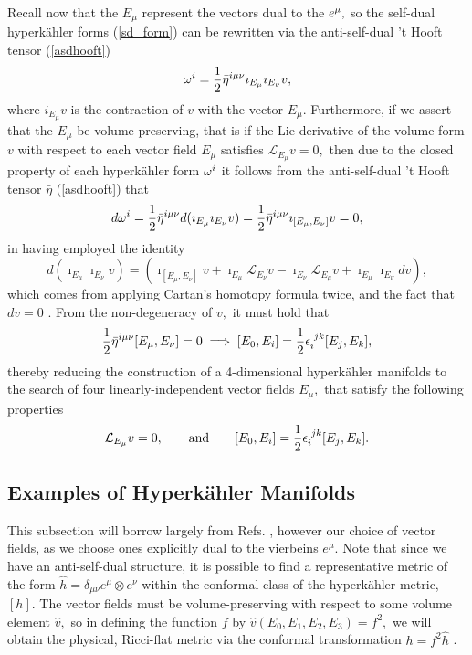 \documentclass[a4paper,12pt, onecolumn, notitlepage]{article}
\theoremstyle{definition}
\theoremstyle{remark}
\newcommand{\w}{\omega}
\newcommand{\m}{\mu}
\newcommand{\n}{\nu}
\newcommand{\e}{\epsilon}
\newcommand{\HK}{hyperk\"ahler }
\begin{document}
Recall now that the $E_{\m}$ represent the vectors dual to the $e\indices{^\m},$ so the self-dual \HK forms (\ref{sd_form}) can be rewritten via the anti-self-dual 't Hooft tensor (\ref{asdhooft}) \cite{ootsuka_1998}
\begin{equation*}
\w^{i} = \frac{1}{2}\bar{\eta}\indices{^i^\m^\n}\imath_{E_{\m}}\imath_{E_{\n}}v,
\end{equation*}
where $i_{E_{\m}}v$ is the contraction of $v$ with the vector $E_{\m}.$ Furthermore, if we assert that the $E_{\m}$ be volume preserving, that is if the Lie derivative of the volume-form $v$ with respect to each vector field $E_{\m}$ satisfies $\mathcal{L}_{E_{\m}}v = 0,$ then due to the closed property of each \HK form $\w\indices{^i}$ it follows from the anti-self-dual 't Hooft tensor $\bar{\eta}$ (\ref{asdhooft}) that
\begin{align*}
	d\w^{i} = \frac{1}{2}\bar{\eta}\indices{^i^\m^\n}d(\imath_{E_{\m}}\imath_{E_{\n}}v) = \frac{1}{2}\bar{\eta}\indices{^i^\m^\n}\imath_{[E_{\m},E_{\n}]}v=0,
\end{align*}
in having employed the identity
\begin{equation*}
	\label{cartan}
	d(\imath_{E_{\m}}\imath_{E_{\n}}v)=(\imath_{[E_{\m},E_{\n}]}v + \imath_{E_{\m}}\mathcal{L}_{E_{\n}}v - \imath_{E_{\n}}\mathcal{L}_{E_{\m}}v + \imath_{E_{\m}}\imath_{E_{\n}}dv),
\end{equation*}
which comes from applying Cartan's homotopy formula twice, and the fact that $dv=0$ \cite{donaldson}. From the non-degeneracy of $v,$ it must hold that
\begin{equation}
	\label{half_flat}
	\frac{1}{2}\bar{\eta}\indices{^i^\m^\n}[E_{\m},E_{\n}] = 0 \implies [E_{0},E_{i}]=\frac{1}{2}\e\indices{_i^j^k}[E_{j},E_{k}],
\end{equation}
thereby reducing the construction of a 4-dimensional \HK manifolds to the search of four linearly-independent vector fields $E_{\m},$ that satisfy the following properties \cite{ootsuka_1998}
\begin{gather}
	\label{asj}
	\mathcal{L}_{E_{\m}}v = 0,\qquad \text{and}\qquad [E_{0},E_{i}]=\frac{1}{2}\e\indices{_i^j^k}[E_{j},E_{k}].
\end{gather}

\subsection{Examples of Hyperk\"ahler Manifolds}
This subsection will borrow largely from Refs. \cite{ootsuka_1998,joyce_1995}, however our choice of vector fields, as we choose ones explicitly dual to the vierbeins $e^{\m}$. Note that since we have an anti-self-dual structure, it is possible to find a representative metric of the form $\hat{h}=\delta_{\m\n}e^{\m}\otimes e^{\n}$ within the conformal class of the \HK metric, $[h]$. The vector fields must be volume-preserving with respect to some volume element $\hat{v},$ so in defining the function $f$ by $\hat{v}(E_{0},E_{1},E_{2},E_{3}) = f^{2},$ we will obtain the physical, Ricci-flat metric via the conformal transformation $h=f^{2}\hat{h}$ \cite{grant_1997}.\\
\end{document}

